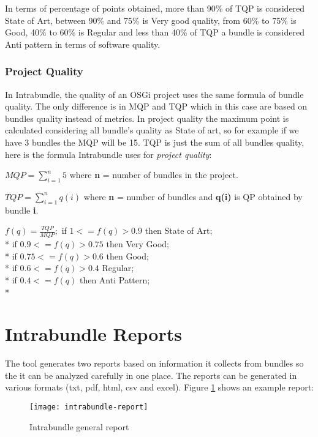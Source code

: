 In terms of percentage of points obtained, more than 90\% of TQP is considered State of Art, between 90\% and 75\% is Very good quality, from 60\% to 75\% is Good, 40\% to 60\% is Regular and less than 40\% of TQP a bundle is considered Anti pattern in terms of software quality. 

\subsubsection{Project Quality}
In Intrabundle, the quality of an OSGi project uses the same formula of bundle quality. The only difference is in MQP and TQP which in this case are based on bundles quality instead of metrics. In project quality the maximum point is calculated considering all bundle's quality as State of art, so for example if we have 3 bundles the MQP will be 15. TQP is just the sum of all bundles quality, here is the formula Intrabundle uses for \emph{project quality}:

\(MQP = \sum_{i=1}^{n} 5 \) where \textbf{n} = number of bundles in the project. \newline

\(TQP = \sum_{i=1}^{n} q(i) \) where \textbf{n} = number of bundles and \textbf{q(i)} is QP obtained by bundle \textbf{i}. \newline

 
\(
f(q) = \frac{TQP}{MQP};
\)
\newline
\newline
 if \( 1 <= f(q) > 0.9 \) then State of Art; \\*
 if \( 0.9 <= f(q) > 0.75 \) then Very Good; \\*
 if \( 0.75 <= f(q) > 0.6 \) then Good; \\*
 if \( 0.6 <= f(q) > 0.4 \) Regular; \\*
 if \( 0.4 <= f(q) \) then Anti Pattern;\\*


\section{Intrabundle Reports}
\label{sec:intrabundle-reports}
The tool generates two reports based on information it collects from bundles so the it can be analyzed carefully in one place. The reports can be generated in various formats (txt, pdf, html, csv and excel). Figure \ref{intrabundle-report1} shows an example report:  

\begin{figure}[h]
\caption{Intrabundle general report}
\label{intrabundle-report1}
\centering
\texttt{[image: intrabundle-report]}
\end{figure}  
\FloatBarrier

